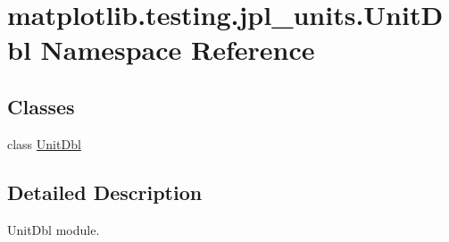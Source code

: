 \hypertarget{namespacematplotlib_1_1testing_1_1jpl__units_1_1UnitDbl}{}\section{matplotlib.\+testing.\+jpl\+\_\+units.\+Unit\+Dbl Namespace Reference}
\label{namespacematplotlib_1_1testing_1_1jpl__units_1_1UnitDbl}
\subsection*{Classes}
\begin{DoxyCompactItemize}
\item 
class \hyperlink{classmatplotlib_1_1testing_1_1jpl__units_1_1UnitDbl_1_1UnitDbl}{Unit\+Dbl}
\end{DoxyCompactItemize}


\subsection{Detailed Description}
\begin{DoxyVerb}UnitDbl module.\end{DoxyVerb}
 